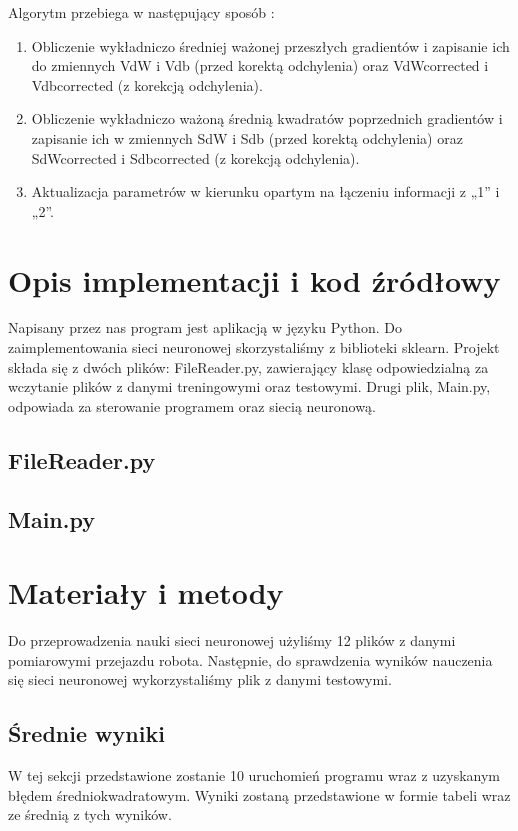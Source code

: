 \documentclass{classrep}
\begin{document}
Algorytm przebiega w następujący sposób \cite{adamdzialanie}:
\begin{enumerate}
	\item Obliczenie wykładniczo średniej ważonej przeszłych gradientów i zapisanie ich do zmiennych VdW i Vdb (przed korektą odchylenia) oraz VdWcorrected i Vdbcorrected (z korekcją odchylenia).
	\item Obliczenie wykładniczo ważoną średnią kwadratów poprzednich gradientów i zapisanie ich w zmiennych SdW i Sdb (przed korektą odchylenia) oraz SdWcorrected i Sdbcorrected (z korekcją odchylenia).
	\item Aktualizacja parametrów w kierunku opartym na łączeniu informacji z „1” i „2”.
\end{enumerate}

\section{Opis implementacji i kod źródłowy} 
Napisany przez nas program jest aplikacją w języku Python. Do zaimplementowania sieci neuronowej skorzystaliśmy z biblioteki sklearn. \cite{doc} Projekt składa się z dwóch plików: FileReader.py, zawierający klasę odpowiedzialną za wczytanie plików z danymi treningowymi oraz testowymi. Drugi plik, Main.py, odpowiada za sterowanie programem oraz siecią neuronową.

\subsection{FileReader.py}



\subsection{Main.py}




\section{Materiały i metody}
Do przeprowadzenia nauki sieci neuronowej użyliśmy 12 plików z danymi pomiarowymi przejazdu robota. Następnie, do sprawdzenia wyników nauczenia się sieci neuronowej wykorzystaliśmy plik z danymi testowymi. \cite{pliki}

\subsection{Średnie wyniki}
W tej sekcji przedstawione zostanie 10 uruchomień programu wraz z uzyskanym błędem średniokwadratowym. Wyniki zostaną przedstawione w formie tabeli wraz ze średnią z tych wyników.
\end{document}
